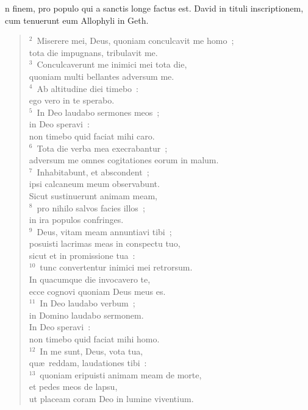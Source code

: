 \bchapter
{}n finem, pro populo qui a sanctis longe factus est. David in tituli inscriptionem, cum tenuerunt eum Allophyli in Geth.
\begin{flushleft}\begin{verse}\vspace{6pt}${}^{2}$~Miserere mei, Deus, quoniam conculcavit me homo~;\\ tota die impugnans, tribulavit me.\\
${}^{3}$~Conculcaverunt me inimici mei tota die,\\ quoniam multi bellantes adversum me.\\
${}^{4}$~Ab altitudine diei timebo~:\\ ego vero in te sperabo.\\
${}^{5}$~In Deo laudabo sermones meos~;\\ in Deo speravi~:\\ non timebo quid faciat mihi caro.\\
${}^{6}$~Tota die verba mea execrabantur~;\\ adversum me omnes cogitationes eorum in malum.\\
${}^{7}$~Inhabitabunt, et abscondent~;\\ ipsi calcaneum meum observabunt.\\ Sicut sustinuerunt animam meam,\\
${}^{8}$~pro nihilo salvos facies illos~;\\ in ira populos confringes.\\
${}^{9}$~Deus, vitam meam annuntiavi tibi~;\\ posuisti lacrimas meas in conspectu tuo,\\ sicut et in promissione tua~:\\
${}^{10}$~tunc convertentur inimici mei retrorsum.\\ In quacumque die invocavero te,\\ ecce cognovi quoniam Deus meus es.\\
${}^{11}$~In Deo laudabo verbum~;\\ in Domino laudabo sermonem.\\ In Deo speravi~:\\ non timebo quid faciat mihi homo.\\
${}^{12}$~In me sunt, Deus, vota tua,\\ qu\ae\ reddam, laudationes tibi~:\\
${}^{13}$~quoniam eripuisti animam meam de morte,\\ et pedes meos de lapsu,\\ ut placeam coram Deo in lumine viventium.\end{verse}\end{flushleft}



